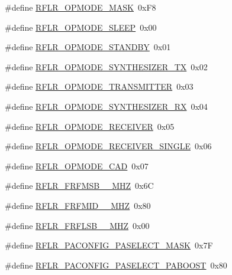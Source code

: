 \begin{DoxyCompactItemize}
\#define \hyperlink{sx1276Regs-LoRa_8h_ae81262dc31f1b6843d2d09125dda0659}{R\+F\+L\+R\+\_\+\+O\+P\+M\+O\+D\+E\+\_\+\+M\+A\+SK}~0x\+F8
\item 
\#define \hyperlink{sx1276Regs-LoRa_8h_a042c25d6f974d449c3ba24782751cd45}{R\+F\+L\+R\+\_\+\+O\+P\+M\+O\+D\+E\+\_\+\+S\+L\+E\+EP}~0x00
\item 
\#define \hyperlink{sx1276Regs-LoRa_8h_afb7498d406642d2e07cb383010697c0a}{R\+F\+L\+R\+\_\+\+O\+P\+M\+O\+D\+E\+\_\+\+S\+T\+A\+N\+D\+BY}~0x01
\item 
\#define \hyperlink{sx1276Regs-LoRa_8h_ab5c2916d7198480084d9275020ed67f0}{R\+F\+L\+R\+\_\+\+O\+P\+M\+O\+D\+E\+\_\+\+S\+Y\+N\+T\+H\+E\+S\+I\+Z\+E\+R\+\_\+\+TX}~0x02
\item 
\#define \hyperlink{sx1276Regs-LoRa_8h_a2ccdd26a6b1283c6f8f0710b49269d02}{R\+F\+L\+R\+\_\+\+O\+P\+M\+O\+D\+E\+\_\+\+T\+R\+A\+N\+S\+M\+I\+T\+T\+ER}~0x03
\item 
\#define \hyperlink{sx1276Regs-LoRa_8h_a51b6a8bcd4bb5e0016428956ffa91794}{R\+F\+L\+R\+\_\+\+O\+P\+M\+O\+D\+E\+\_\+\+S\+Y\+N\+T\+H\+E\+S\+I\+Z\+E\+R\+\_\+\+RX}~0x04
\item 
\#define \hyperlink{sx1276Regs-LoRa_8h_a18ffa4e2930797bbeb71fd15ae77dfe0}{R\+F\+L\+R\+\_\+\+O\+P\+M\+O\+D\+E\+\_\+\+R\+E\+C\+E\+I\+V\+ER}~0x05
\item 
\#define \hyperlink{sx1276Regs-LoRa_8h_a0cfa7959ea68f8e81d1ee04e8a3ef596}{R\+F\+L\+R\+\_\+\+O\+P\+M\+O\+D\+E\+\_\+\+R\+E\+C\+E\+I\+V\+E\+R\+\_\+\+S\+I\+N\+G\+LE}~0x06
\item 
\#define \hyperlink{sx1276Regs-LoRa_8h_a8e3c7ec4d0aceedae1069a3b6d8d6bd2}{R\+F\+L\+R\+\_\+\+O\+P\+M\+O\+D\+E\+\_\+\+C\+AD}~0x07
\item 
\#define \hyperlink{sx1276Regs-LoRa_8h_ac8e626a7d3028cc58dbe937ce2cb4fef}{R\+F\+L\+R\+\_\+\+F\+R\+F\+M\+S\+B\+\_\+\_\+\+M\+HZ}~0x6C
\item 
\#define \hyperlink{sx1276Regs-LoRa_8h_a2b6e1709a469a8e5fe8c3099036576b2}{R\+F\+L\+R\+\_\+\+F\+R\+F\+M\+I\+D\+\_\+\_\+\+M\+HZ}~0x80
\item 
\#define \hyperlink{sx1276Regs-LoRa_8h_a9fbeb4068d680304497804b2e3b01cc1}{R\+F\+L\+R\+\_\+\+F\+R\+F\+L\+S\+B\+\_\+\_\+\+M\+HZ}~0x00
\item 
\#define \hyperlink{sx1276Regs-LoRa_8h_a98fc674afce865acf9efb9a1c2ab39a3}{R\+F\+L\+R\+\_\+\+P\+A\+C\+O\+N\+F\+I\+G\+\_\+\+P\+A\+S\+E\+L\+E\+C\+T\+\_\+\+M\+A\+SK}~0x7F
\item 
\#define \hyperlink{sx1276Regs-LoRa_8h_a268b1d9d7fa806038150cabff6dee9a7}{R\+F\+L\+R\+\_\+\+P\+A\+C\+O\+N\+F\+I\+G\+\_\+\+P\+A\+S\+E\+L\+E\+C\+T\+\_\+\+P\+A\+B\+O\+O\+ST}~0x80

\end{DoxyCompactItemize}
